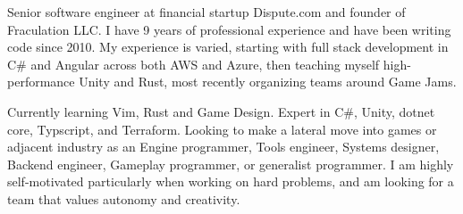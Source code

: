

\begin{cvparagraph}

Senior software engineer at financial startup Dispute.com and founder of Fraculation LLC.\@
I have 9 years of professional experience and have been writing code since 2010. My experience is varied, starting with 
full stack development in C\# and Angular across both AWS and Azure, then teaching myself high-performance Unity and Rust,
most recently organizing teams around Game Jams.

Currently learning Vim, Rust and Game Design. Expert in C\#, Unity, dotnet core, Typscript, and Terraform.
Looking to make a lateral move into games or adjacent industry as an Engine programmer, 
Tools engineer,  Systems designer, Backend engineer, Gameplay programmer, or generalist programmer.
I am highly self-motivated particularly when working on hard problems, 
and am looking for a team that values autonomy and creativity.

\end{cvparagraph}
